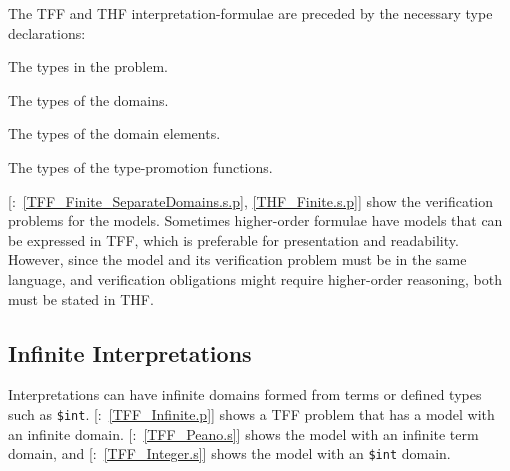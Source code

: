 \documentclass{ceurart}
\newcommand{\smalltt}[1]{\small \texttt{#1}}
\newcommand{\example}{{\scriptsize \faFile[regular]}}
\newenvironment{packed_itemize}{
\vspace*{-0.3em}
\begin{itemize}
\setlength{\partopsep}{0pt}
\setlength{\itemsep}{1pt}
\setlength{\parskip}{0pt}
\setlength{\parsep}{0pt}
}{\end{itemize}}
\begin{document}
The TFF and THF interpretation-formulae are preceded by the necessary type declarations:
\begin{packed_itemize}
\item The types in the problem.
\item The types of the domains.
\item The types of the domain elements.
\item The types of the type-promotion functions.
\end{packed_itemize}

[\example{}:~\ref{TFF_Finite_SeparateDomains.s.p}, 
\ref{THF_Finite.s.p}] show the verification problems for the models.
Sometimes higher-order formulae have models that can be expressed in TFF, which is preferable for
presentation and readability. 
However, since the model and its verification problem must be in the same language, and 
verification obligations might require higher-order reasoning, both must be stated in THF.

\subsection{Infinite Interpretations}
\label{TarskianInfinite}

Interpretations can have infinite domains formed from terms or defined types such as 
\smalltt{\$int}.
[\example{}:~\ref{TFF_Infinite.p}] shows a TFF problem that has a 
model with an infinite domain.
[\example{}:~\ref{TFF_Peano.s}] shows the model with an infinite term 
domain, and [\example{}:~\ref{TFF_Integer.s}] shows the model with an
\smalltt{\$int} domain.
\end{document}
